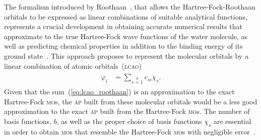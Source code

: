 The formalism introduced by Roothaan~\cite{Roothaan_HF}, that allows
the Hartree-Fock-Roothaan orbitals to be expressed as linear
combinations of suitable analytical functions, represents a crucial
development in obtaining accurate numerical results that approximate
to the true Hartree-Fock wave functions of the water molecule, as well
as predicting chemical properties in addition to the binding energy of
its ground
state~\cite{scf_lc_1967,EllisonShullh2o_1955,Neumann_gaussian_1968,Pitzer_1970,Pitzer_1972}. This
approach proposes to represent the molecular orbitals by a linear
combination of atomic orbitals~(\textsc{lcao})~\cite{Roothaan_HF}
%
\begin{eqnarray}
  \begin{split}
    \varphi_{i} & = \sum\limits_{s=1}\limits^{b} c_{si} \chi_{s}.
  \end{split}
  \label{eq:lcao_roothaan}
\end{eqnarray}
%
Given that the sum~(\ref{eq:lcao_roothaan}) is an approximation to the
exact Hartree-Fock \textsc{mo}s, the \textsc{ap} built from these
molecular orbitals would be a less good approximation to the exact
\textsc{ap} built from the Hartree-Fock \textsc{mo}s. The number of
basis functions, $b$, as well as the proper choice of basis functions
$\chi_{s}$ are essential in order to obtain \textsc{mo}s that resemble
the Hartree-Fock \textsc{mo}s with negligible
error~\cite{Moccia_JCP_2164,Moccia_JCP_2176,Moccia_1964}.

